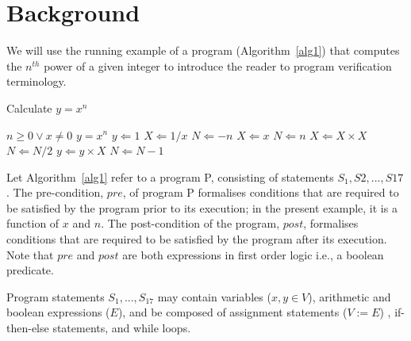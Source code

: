 \section{Background} \label{background}

We will use the running example of a program (Algorithm~\ref{alg1}) that computes the $n^{th}$ power of a given integer to introduce the reader to program verification terminology. 

\begin{algorithm}                      %
\caption{Calculate $y = x^n$}          %
\label{alg1}                           %
\begin{algorithmic}[1]                    %
    \REQUIRE $n \geq 0 \vee x \neq 0$
    \ENSURE $y = x^n$
    \STATE $y \Leftarrow 1$
        \STATE $X \Leftarrow 1 / x$
        \STATE $N \Leftarrow -n$
    \ELSE
        \STATE $X \Leftarrow x$
        \STATE $N \Leftarrow n$
    \ENDIF
            \STATE $X \Leftarrow X \times X$
            \STATE $N \Leftarrow N / 2$
        \ELSE[$N$ is odd]
            \STATE $y \Leftarrow y \times X$
            \STATE $N \Leftarrow N - 1$
        \ENDIF
    \ENDWHILE
\end{algorithmic}
\end{algorithm}

Let Algorithm~\ref{alg1} refer to a program P, consisting of statements $S_{1}, S{2}, ..., S{17}$. The pre-condition, $pre$, of program P formalises conditions that are required to be satisfied by the program prior to its execution; in the present example, it is a function of $x$ and $n$. The post-condition of the program, $post$, formalises conditions that are required to be satisfied by the program after its execution. Note that $pre$ and $post$ are both expressions in first order logic i.e., a boolean predicate.

Program statements $S_{1}, ... , S_{17}$ may contain variables ($x, y\in V$), arithmetic and boolean expressions ($E$), and be composed of assignment statements ($V:=E$) , if-then-else statements, and while loops.

